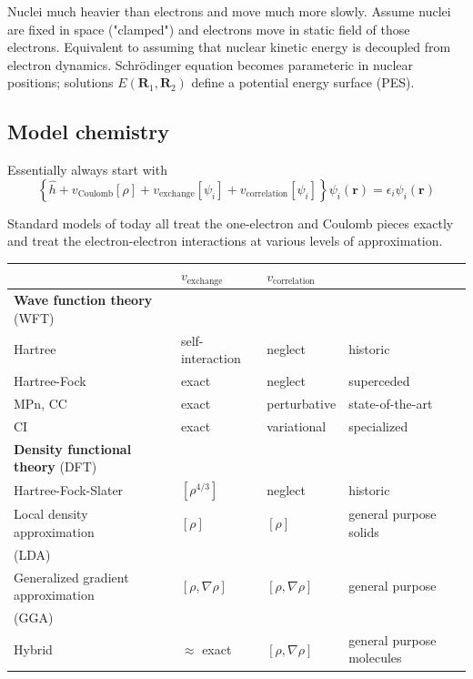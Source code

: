 \documentclass[11pt]{article}
\begin{document}
Nuclei much heavier than electrons and move much more slowly.  Assume nuclei are fixed in
space ("clamped") and electrons move in static field of those electrons. Equivalent to
assuming that nuclear kinetic energy is decoupled from electron dynamics.
Schr\"{o}dinger equation becomes parameteric in nuclear positions; solutions
$E(\mathbf{R}_{1},\mathbf{R}_{2})$ define a potential energy surface (PES).
\subsection{Model chemistry}
\label{sec-5-2}
Essentially always start with
\begin{equation}
\left \{ \hat{h} +v_{\text{Coulomb}}[\rho] + v_\text{exchange}[\psi_{i}] + v_\text{correlation}[\psi_{i}]\right\}\psi_i(\mathbf{r}) =\epsilon_i \psi_i(\mathbf{r})
\end{equation}

Standard models of today all treat the one-electron and Coulomb pieces exactly and treat
the electron-electron interactions at various levels of approximation.
\begin{center}
\begin{tabular}{llll}
\hline
 & $v_{\text{exchange}}$ & $v_{\text{correlation}}$ & \\
\hline
\textbf{Wave function theory} (WFT) &  &  & \\
Hartree & self-interaction & neglect & historic\\
Hartree-Fock & exact & neglect & superceded\\
MPn, CC & exact & perturbative & state-of-the-art\\
CI & exact & variational & specialized\\
\hline
\textbf{Density functional theory} (DFT) &  &  & \\
Hartree-Fock-Slater & $[\rho^{{4/3}}]$ & neglect & historic\\
Local density approximation & $[\rho]$ & $[\rho]$ & general purpose solids\\
(LDA) &  &  & \\
Generalized gradient approximation & $[\rho,\nabla\rho]$ & $[\rho,\nabla\rho]$ & general purpose\\
(GGA) &  &  & \\
Hybrid & $\approx$ exact & $[\rho,\nabla\rho]$ & general purpose molecules\\
\hline
\end{tabular}
\end{center}
\end{document}
